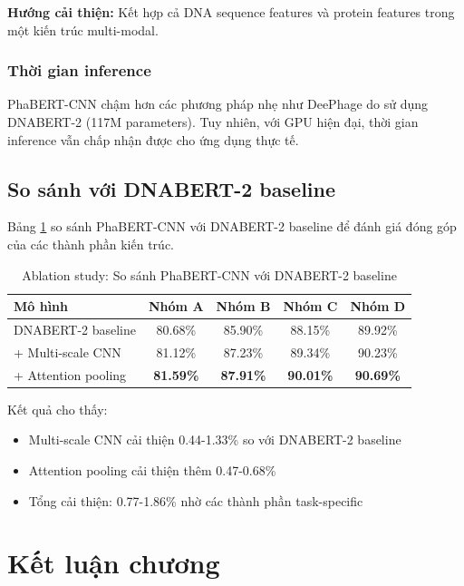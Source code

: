 \textbf{Hướng cải thiện:} Kết hợp cả DNA sequence features và protein features trong một kiến trúc multi-modal.

\subsubsection{Thời gian inference}

PhaBERT-CNN chậm hơn các phương pháp nhẹ như DeePhage do sử dụng DNABERT-2 (117M parameters). Tuy nhiên, với GPU hiện đại, thời gian inference vẫn chấp nhận được cho ứng dụng thực tế.

\subsection{So sánh với DNABERT-2 baseline}

Bảng \ref{tab:ablation_study} so sánh PhaBERT-CNN với DNABERT-2 baseline để đánh giá đóng góp của các thành phần kiến trúc.

\begin{table}[h]
\centering
\caption{Ablation study: So sánh PhaBERT-CNN với DNABERT-2 baseline}
\label{tab:ablation_study}
\begin{tabular}{lcccc}
\toprule
\textbf{Mô hình} & \textbf{Nhóm A} & \textbf{Nhóm B} & \textbf{Nhóm C} & \textbf{Nhóm D} \\
\midrule
DNABERT-2 baseline & 80.68\% & 85.90\% & 88.15\% & 89.92\% \\
+ Multi-scale CNN & 81.12\% & 87.23\% & 89.34\% & 90.23\% \\
+ Attention pooling & \textbf{81.59\%} & \textbf{87.91\%} & \textbf{90.01\%} & \textbf{90.69\%} \\
\bottomrule
\end{tabular}
\end{table}

Kết quả cho thấy:
\begin{itemize}
    \item Multi-scale CNN cải thiện 0.44-1.33\% so với DNABERT-2 baseline
    \item Attention pooling cải thiện thêm 0.47-0.68\%
    \item Tổng cải thiện: 0.77-1.86\% nhờ các thành phần task-specific
\end{itemize}

\section{Kết luận chương}

